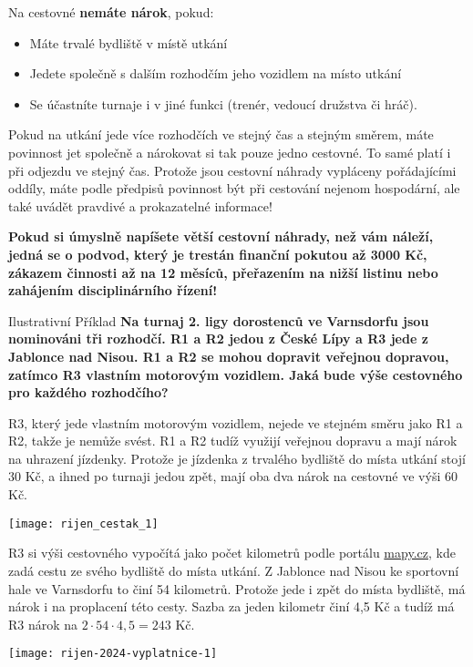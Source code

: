 \documentclass{newsletter}
\begin{document}
Na cestovné \textbf{nemáte nárok}, pokud:
\begin{itemize}
	\item Máte trvalé bydliště v místě utkání
	\item Jedete společně s dalším rozhodčím jeho vozidlem na místo utkání
	\item Se účastníte turnaje i v jiné funkci (trenér, vedoucí družstva či hráč).
\end{itemize}

Pokud na utkání jede více rozhodčích ve stejný čas a stejným směrem, máte povinnost jet společně a nárokovat si tak pouze jedno cestovné. To samé platí i při odjezdu ve stejný čas. Protože jsou cestovní náhrady vypláceny pořádajícími oddíly, máte podle předpisů povinnost být při cestování nejenom hospodární, ale také uvádět pravdivé a prokazatelné informace!

\textcolor{cfred}{\textbf{Pokud si úmyslně napíšete větší cestovní náhrady, než vám náleží, jedná se o podvod, který je trestán finanční pokutou až 3000 Kč, zákazem činnosti až na 12 měsíců, přeřazením na nižší listinu nebo zahájením disciplinárního řízení!}} 

\begin{admonition-info}{Ilustrativní Příklad}
	\textbf{Na turnaj 2. ligy dorostenců ve Varnsdorfu jsou nominováni tři rozhodčí. R1 a R2 jedou z České Lípy a R3 jede z Jablonce nad Nisou. R1 a R2 se mohou dopravit veřejnou dopravou, zatímco R3 vlastním motorovým vozidlem. Jaká bude výše cestovného pro každého rozhodčího?}
	
	\vspace{\baselineskip}
	
	R3, který jede vlastním motorovým vozidlem, nejede ve stejném směru jako R1 a R2, takže je nemůže svést. R1 a R2 tudíž využijí veřejnou dopravu a mají nárok na uhrazení jízdenky. Protože je jízdenka z trvalého bydliště do místa utkání stojí 30 Kč, a ihned po turnaji jedou zpět, mají oba dva nárok na cestovné ve výši 60 Kč.
	
	\texttt{[image: rijen\_cestak\_1]}
	
	R3 si výši cestovného vypočítá jako počet kilometrů podle portálu \href{mapy.cz}{mapy.cz}, kde zadá cestu ze svého bydliště do místa utkání. Z Jablonce nad Nisou ke sportovní hale ve Varnsdorfu to činí 54 kilometrů. Protože jede i zpět do místa bydliště, má nárok i na proplacení této cesty. Sazba za jeden kilometr činí 4,5 Kč a tudíž má R3 nárok na $2 \cdot 54 \cdot 4,5 = 243$ Kč.
	
	\texttt{[image: rijen-2024-vyplatnice-1]}
\end{admonition-info}
\end{document}
